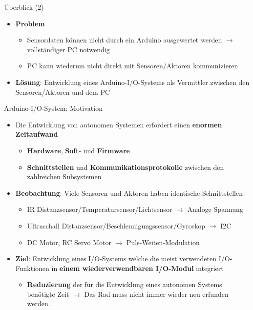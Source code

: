 \documentclass{beamer}
\begin{document}
\begin{frame}{\"Uberblick (2)}
\begin{itemize}
	\item \textbf{Problem}
	\begin{itemize}
		\item Sensordaten k\"onnen nicht durch ein Arduino ausgewertet werden $\rightarrow$ vollst\"andiger PC notwendig
		\item PC kann wiederum nicht direkt mit Sensoren/Aktoren kommunizieren
	\end{itemize}
\end{itemize}
\begin{itemize}
	\item \textbf{L\"osung}: Entwicklung eines Arduino-I/O-Systems als Vermittler zwischen den Sensoren/Aktoren und dem PC
\end{itemize}
\end{frame}
\begin{frame}{Arduino-I/O-System: Motivation}
	\begin{itemize}
		\item Die Entwicklung von autonomen Systemen erfordert einen \textbf{enormen Zeitaufwand}
		\begin{itemize}
			\item \textbf{Hardware}, \textbf{Soft}- und \textbf{Firmware}
			\item \textbf{Schnittstellen} und \textbf{Kommunikationsprotokolle} zwischen den zahlreichen Subsystemen
		\end{itemize}
	\end{itemize}
	\begin{itemize}
		\item \textbf{Beobachtung}: Viele Sensoren und Aktoren haben identische Schnittstellen
		\begin{itemize}
			\item IR Distanzsensor/Temperatursensor/Lichtsensor  $\rightarrow$ Analoge Spannung
			\item Ultraschall Distanzsensor/Beschleunigungssensor/Gyroskop $\rightarrow$ I2C
			\item DC Motor, RC Servo Motor $\rightarrow$ Puls-Weiten-Modulation
		\end{itemize}
	\end{itemize}
	\begin{itemize}
		\item \textbf{Ziel}: Entwicklung eines I/O-Systems welche die meist verwendeten I/O-Funktionen in \textbf{einem wiederverwendbaren I/O-Modul} integriert
		\begin{itemize}
			\item \textbf{Reduzierung} der f\"ur die Entwicklung eines autonomen Systems ben\"otigte Zeit $\rightarrow$ Das Rad muss nicht immer wieder neu erfunden werden.
		\end{itemize}
	\end{itemize}
\end{frame}
\end{document}
